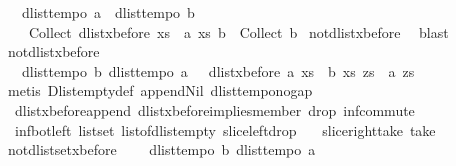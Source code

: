 \begin{isabellebody}
\ \ {\isachardoublequoteopen}{\isasymlbrakk}\ dlist{\isacharunderscore}tempo{}\ a{\isacharsemicolon}\ \ dlist{\isacharunderscore}tempo{}\ b{\isasymrbrakk}\ {\isasymLongrightarrow}\ \isanewline
\ \ \ \ Collect\ {\isacharparenleft}dlist{\isacharunderscore}xbefore\ {\isacharparenleft}{\isasymlambda}xs{\isachardot}\ {\isasymnot}\ a\ xs{\isacharparenright}\ b{\isacharparenright}\ {\isacharequal}\ Collect\ b{\isachardoublequoteclose}\isanewline
%
\isadelimproof
%
\endisadelimproof
%
\isatagproof
{}\isamarkupfalse%
\ not{\isacharunderscore}{}{\isacharunderscore}dlist{\isacharunderscore}xbefore\ \isamarkupfalse%
\ blast%
\endisatagproof
{\isafoldproof}%
%
\isadelimproof
\isanewline
%
\endisadelimproof
\isanewline
{}\isamarkupfalse%
\ not{\isacharunderscore}{}{\isacharunderscore}dlist{\isacharunderscore}xbefore{\isacharcolon}\ \isanewline
\ \ {\isachardoublequoteopen}{\isasymlbrakk}\ dlist{\isacharunderscore}tempo{}\ b{\isacharsemicolon}\ dlist{\isacharunderscore}tempo{}\ a\ {\isasymrbrakk}\ {\isasymLongrightarrow}\ dlist{\isacharunderscore}xbefore\ a\ {\isacharparenleft}{\isasymlambda}xs{\isachardot}\ {\isasymnot}\ b\ xs{\isacharparenright}\ zs\ {\isacharequal}\ a\ zs{\isachardoublequoteclose}\isanewline
%
\isadelimproof
%
\endisadelimproof
%
\isatagproof
{}\isamarkupfalse%
\ {\isacharparenleft}metis\ Dlist{\isachardot}empty{\isacharunderscore}def\ append{\isacharunderscore}Nil{}\ dlist{\isacharunderscore}tempo{\isacharunderscore}{}{\isacharunderscore}no{\isacharunderscore}gap\ \isanewline
\ \ dlist{\isacharunderscore}xbefore{\isacharunderscore}append\ dlist{\isacharunderscore}xbefore{\isacharunderscore}implies{\isacharunderscore}member{}\ drop{\isacharunderscore}{}\ inf{\isachardot}commute\ \isanewline
\ \ inf{\isacharunderscore}bot{\isacharunderscore}left\ list{\isachardot}set{\isacharparenleft}{}{\isacharparenright}\ list{\isacharunderscore}of{\isacharunderscore}dlist{\isacharunderscore}empty\ slice{\isacharunderscore}left{\isacharunderscore}drop\ \isanewline
\ \ slice{\isacharunderscore}right{\isacharunderscore}take\ take{\isacharunderscore}{}{\isacharparenright}%
\endisatagproof
{\isafoldproof}%
%
\isadelimproof
\isanewline
%
\endisadelimproof
\isanewline
{}\isamarkupfalse%
\ not{\isacharunderscore}{}{\isacharunderscore}dlistset{\isacharunderscore}xbefore{\isacharcolon}\ \isanewline
\ \ {\isachardoublequoteopen}{\isasymlbrakk}\ dlist{\isacharunderscore}tempo{}\ b{\isacharsemicolon}\ dlist{\isacharunderscore}tempo{}\ a\ {\isasymrbrakk}\ {\isasymLongrightarrow}\ \isanewline

\end{isabellebody}
